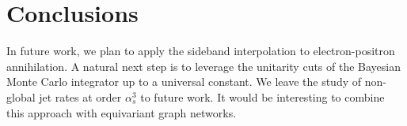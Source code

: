 \section{Conclusions}\label{sec:conclusions}

In future work, we plan to apply the sideband interpolation to
electron-positron annihilation. A natural next step is to leverage the
unitarity cuts of the Bayesian Monte Carlo integrator up to a universal
constant. We leave the study of non-global jet rates at order
$\alpha_s^3$ to future work. It would be interesting to combine this
approach with equivariant graph networks.

